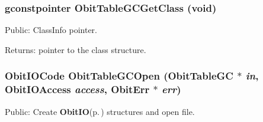 \subsubsection{\setlength{\rightskip}{0pt plus 5cm}gconstpointer Obit\-Table\-GCGet\-Class (void)}\label{ObitTableGC_8h_a13}


Public: Class\-Info pointer. 

\begin{Desc}
\item[Returns:]pointer to the class structure. \end{Desc}
\subsubsection{\setlength{\rightskip}{0pt plus 5cm}Obit\-IOCode Obit\-Table\-GCOpen ({\bf Obit\-Table\-GC} $\ast$ {\em in}, Obit\-IOAccess {\em access}, {\bf Obit\-Err} $\ast$ {\em err})}\label{ObitTableGC_8h_a17}


Public: Create {\bf Obit\-IO}{\rm (p.\,\pageref{structObitIO})} structures and open file. 

